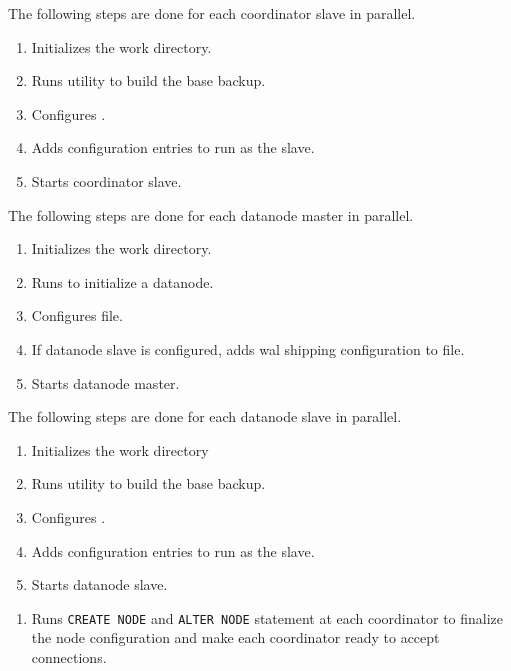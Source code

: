 
    The following steps are done for each coordinator slave in parallel.
  
    \begin{enumerate}
		\item Initializes the work directory.
		\item Runs  utility to build the base backup.
		\item Configures .
		\item Adds  configuration entries to run as the slave.
		\item Starts coordinator slave.
    \end{enumerate}


    The following steps are done for each datanode master in parallel.
  
    \begin{enumerate}
		\item Initializes the work directory.
		\item Runs  to initialize a datanode.
		\item Configures  file.
		\item If datanode slave is configured, adds wal shipping configuration to
			   file.
		\item Starts datanode master.
    \end{enumerate}


    The following steps are done for each datanode slave in parallel.
  
    \begin{enumerate}
		\item Initializes the work directory
		\item Runs  utility to build the base backup.
		\item Configures .
		\item Adds  configuration entries to run as the slave.
		\item Starts datanode slave.
    \end{enumerate}


    \begin{enumerate}
		\item Runs \texttt{CREATE NODE} and \texttt{ALTER NODE} statement at each coordinator to
			  finalize the node configuration and make each coordinator ready to accept connections.
    \end{enumerate}



